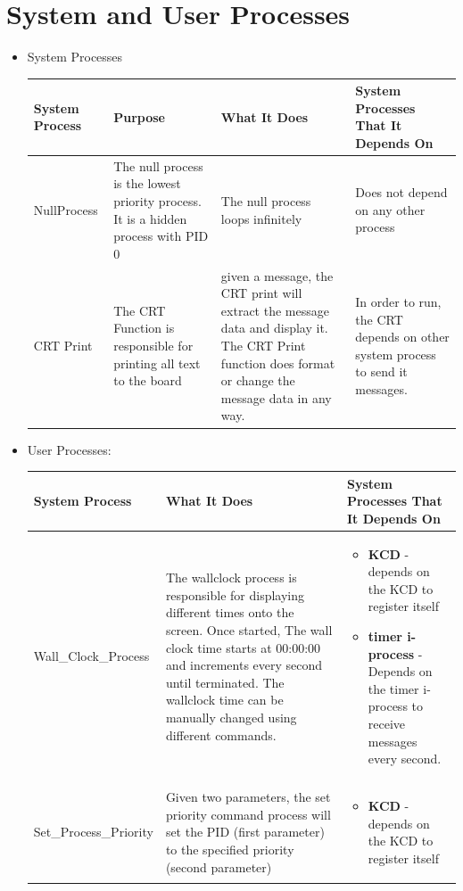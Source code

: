 \documentclass[11pt, oneside]{article}
\begin{document}
\section{System and User Processes}
\begin{itemize}
\item System Processes \\ \newline
\begin{tabular}{|L{2cm}|L{4cm}|L{4.5cm}|L{4cm}|}\hline
\textbf{System Process} & \textbf{Purpose} & \textbf{What It Does} & \textbf{System Processes That It Depends On} \\ \hline
NullProcess & The null process is the lowest priority process. It is a hidden process with PID 0 & The null process loops infinitely & Does not depend on any other process \\ \hline

CRT Print & The CRT Function is responsible for printing all text to the board & given a message, the CRT print will extract the message data and display it. The CRT Print function does format or change the message data in any way. & In order to run, the CRT depends on other system process to send it messages. \\ \hline
\end{tabular}
\newline
\item User Processes: \\ \newline
\begin{tabular}{|L{3cm}|L{7cm}|L{5cm}|}\hline
\textbf{System Process} & \textbf{What It Does} & \textbf{System Processes That It Depends On} \\ \hline
Wall\_Clock\_Process & The wallclock process is responsible for displaying different times onto the screen. Once started, The wall clock time starts at 00:00:00 and increments every second until terminated. The wallclock time can be manually changed using different commands. & \begin{itemize}
\item \textbf{KCD} - depends on the KCD to register itself
\item \textbf{timer i-process} - Depends on the timer i-process to receive messages every second.
\end{itemize}\\ \hline
Set\_Process\_Priority & Given two parameters, the set priority command process will set the PID (first parameter) to the specified priority (second parameter) &
\begin{itemize}
\item \textbf{KCD} - depends on the KCD to register itself
\end{itemize} \\ \hline
\end {tabular}
\end{itemize}
\end{document}
